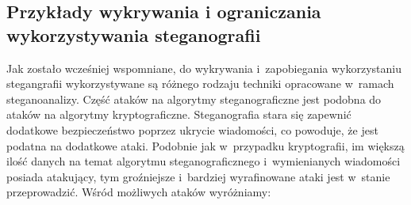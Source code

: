 \documentclass[a4paper, twoside, 12pt]{report}
\begin{document}
        \subsection{Przykłady wykrywania i ograniczania  wykorzystywania steganografii}
        Jak zostało wcześniej wspomniane, do wykrywania i~zapobiegania wykorzystaniu stegangrafii
        wykorzystywane są różnego rodzaju techniki opracowane w~ramach steganoanalizy.
        Część ataków na algorytmy steganograficzne jest podobna do ataków na
        algorytmy kryptograficzne. Steganografia stara się zapewnić dodatkowe bezpieczeństwo
        poprzez ukrycie wiadomości, co powoduje, że jest podatna na dodatkowe ataki.
        Podobnie jak w~przypadku kryptografii, im większą ilość danych na temat
        algorytmu steganograficznego i~wymienianych wiadomości posiada atakujący,
        tym groźniejsze i~bardziej wyrafinowane ataki jest w~stanie przeprowadzić.
        Wśród możliwych ataków wyróżniamy\cite{DISAPPEARINGCRYPTOEMBEDDINGMETDATA}:
\end{document}
